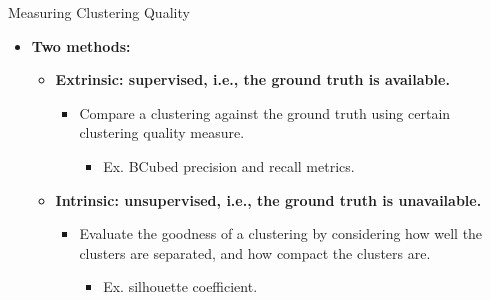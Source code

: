 \begin{frame}{Measuring Clustering Quality}
	\begin{itemize}
		\item \textbf{Two methods:}
		      \begin{itemize}
			      \item \textbf{{\color{airforceblue}Extrinsic}: supervised, i.e.,
				            the ground truth is available.}
			            \begin{itemize}
				            \item Compare a clustering against the ground truth using
				                  certain clustering quality measure.
				                  \begin{itemize}
					                  \item Ex. BCubed precision and recall metrics.
				                  \end{itemize}
			            \end{itemize}
			      \item \textbf{{\color{airforceblue}Intrinsic}: unsupervised, i.e.,
				            the ground truth is unavailable.}
			            \begin{itemize}
				            \item Evaluate the goodness of a clustering by considering how
				                  well the clusters are separated, and how compact the clusters
				                  are.
				                  \begin{itemize}
					                  \item Ex. silhouette coefficient.
				                  \end{itemize}
			            \end{itemize}
		      \end{itemize}
	\end{itemize}
\end{frame}

